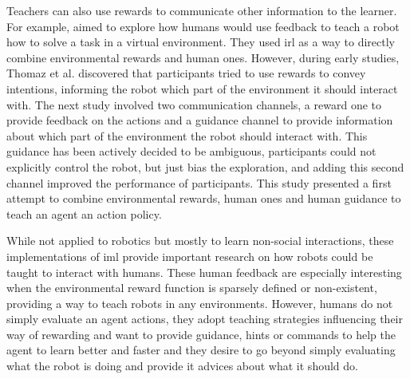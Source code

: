 Teachers can also use rewards to communicate other information to the learner. For example, \cite{thomaz2008teachable} aimed to explore how humans would use feedback to teach a robot how to solve a task in a virtual environment. They used \acrfull{irl} as a way to directly combine environmental rewards and human ones. However, during early studies, Thomaz et al. discovered that participants tried to use rewards to convey intentions, informing the robot which part of the environment it should interact with. The next study involved two communication channels, a reward one to provide feedback on the actions and a guidance channel to provide information about which part of the environment the robot should interact with. This guidance has been actively decided to be ambiguous, participants could not explicitly control the robot, but just bias the exploration, and adding this second channel improved the performance of participants. This study presented a first attempt to combine environmental rewards, human ones and human guidance to teach an agent an action policy.



While not applied to robotics but mostly to learn non-social interactions, these implementations of \gls{iml} provide important research on how robots could be taught to interact with humans. These human feedback are especially interesting when the environmental reward function is sparsely defined or non-existent, providing a way to teach robots in any environments. However, humans do not simply evaluate an agent actions, they adopt teaching strategies influencing their way of rewarding and want to provide guidance, hints or commands to help the agent to learn better and faster and they desire to go beyond simply evaluating what the robot is doing and provide it advices about what it should do.

